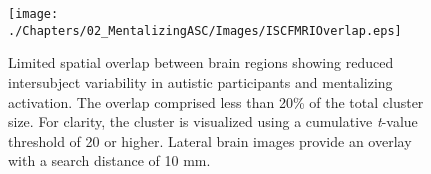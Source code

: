 \begin{figure}[!ht]
	\centering
    \texttt{[image: ./Chapters/02\_MentalizingASC/Images/ISCFMRIOverlap.eps]}
	\caption{Limited spatial overlap between brain regions showing reduced intersubject variability in autistic participants and mentalizing activation. The overlap comprised less than 20\% of the total cluster size. For clarity, the cluster is visualized using a cumulative \textit{t}-value threshold of 20 or higher. Lateral brain images provide an overlay with a search distance of 10 mm. }
    \vspace*{-10pt}
	\label{fig:isc-fmri-overlap}
\end{figure}



